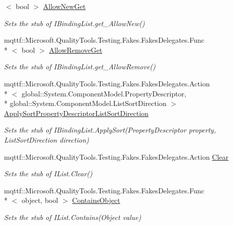 \begin{DoxyCompactItemize}
$<$ bool $>$ \hyperlink{class_system_1_1_component_model_1_1_fakes_1_1_stub_i_binding_list_aed432d2f20d2168bf2ab7e256ac2e9b8}{Allow\-New\-Get}
\begin{DoxyCompactList}\small\item\em Sets the stub of I\-Binding\-List.\-get\-\_\-\-Allow\-New()\end{DoxyCompactList}\item 
mqttf\-::\-Microsoft.\-Quality\-Tools.\-Testing.\-Fakes.\-Fakes\-Delegates.\-Func\\*
$<$ bool $>$ \hyperlink{class_system_1_1_component_model_1_1_fakes_1_1_stub_i_binding_list_adbeabf6fef953529ce37b086157b4a10}{Allow\-Remove\-Get}
\begin{DoxyCompactList}\small\item\em Sets the stub of I\-Binding\-List.\-get\-\_\-\-Allow\-Remove()\end{DoxyCompactList}\item 
mqttf\-::\-Microsoft.\-Quality\-Tools.\-Testing.\-Fakes.\-Fakes\-Delegates.\-Action\\*
$<$ global\-::\-System.\-Component\-Model.\-Property\-Descriptor, \\*
global\-::\-System.\-Component\-Model.\-List\-Sort\-Direction $>$ \hyperlink{class_system_1_1_component_model_1_1_fakes_1_1_stub_i_binding_list_a49447b0aff1936542574e53a42399dc4}{Apply\-Sort\-Property\-Descriptor\-List\-Sort\-Direction}
\begin{DoxyCompactList}\small\item\em Sets the stub of I\-Binding\-List.\-Apply\-Sort(\-Property\-Descriptor property, List\-Sort\-Direction direction)\end{DoxyCompactList}\item 
mqttf\-::\-Microsoft.\-Quality\-Tools.\-Testing.\-Fakes.\-Fakes\-Delegates.\-Action \hyperlink{class_system_1_1_component_model_1_1_fakes_1_1_stub_i_binding_list_a41cc7b94e4cd944f104f32f8b5014274}{Clear}
\begin{DoxyCompactList}\small\item\em Sets the stub of I\-List.\-Clear()\end{DoxyCompactList}\item 
mqttf\-::\-Microsoft.\-Quality\-Tools.\-Testing.\-Fakes.\-Fakes\-Delegates.\-Func\\*
$<$ object, bool $>$ \hyperlink{class_system_1_1_component_model_1_1_fakes_1_1_stub_i_binding_list_addcf2050e4a2a656d777bacd4673f23e}{Contains\-Object}
\begin{DoxyCompactList}\small\item\em Sets the stub of I\-List.\-Contains(\-Object value)\end{DoxyCompactList}\item 

\end{DoxyCompactItemize}
